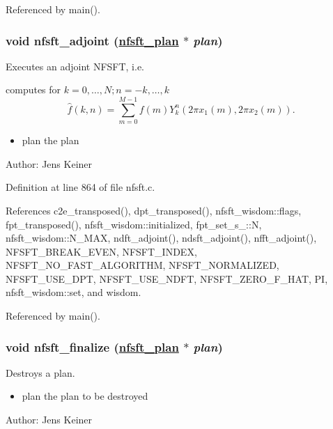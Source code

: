 Referenced by main().\hypertarget{group__nfsft_ga9}{
\subsubsection[nfsft\_\-adjoint]{\setlength{\rightskip}{0pt plus 5cm}void nfsft\_\-adjoint (\hyperlink{structnfsft__plan}{nfsft\_\-plan} $\ast$ {\em plan})}}
\label{group__nfsft_ga9}


Executes an adjoint NFSFT, i.e. 

computes for $k=0,\ldots,N; n=-k,\ldots,k$ \[ \hat{f}(k,n) = \sum_{m = 0}^{M-1} f(m) Y_k^n\left(2\pi x_1(m), 2\pi x_2(m)\right). \]

\begin{itemize}
\item plan the plan\end{itemize}
\begin{Desc}
\item[Author:]Jens Keiner \end{Desc}


Definition at line 864 of file nfsft.c.

References c2e\_\-transposed(), dpt\_\-transposed(), nfsft\_\-wisdom::flags, fpt\_\-transposed(), nfsft\_\-wisdom::initialized, fpt\_\-set\_\-s\_\-::N, nfsft\_\-wisdom::N\_\-MAX, ndft\_\-adjoint(), ndsft\_\-adjoint(), nfft\_\-adjoint(), NFSFT\_\-BREAK\_\-EVEN, NFSFT\_\-INDEX, NFSFT\_\-NO\_\-FAST\_\-ALGORITHM, NFSFT\_\-NORMALIZED, NFSFT\_\-USE\_\-DPT, NFSFT\_\-USE\_\-NDFT, NFSFT\_\-ZERO\_\-F\_\-HAT, PI, nfsft\_\-wisdom::set, and wisdom.

Referenced by main().\hypertarget{group__nfsft_ga10}{
\subsubsection[nfsft\_\-finalize]{\setlength{\rightskip}{0pt plus 5cm}void nfsft\_\-finalize (\hyperlink{structnfsft__plan}{nfsft\_\-plan} $\ast$ {\em plan})}}
\label{group__nfsft_ga10}


Destroys a plan. 

\begin{itemize}
\item plan the plan to be destroyed\end{itemize}
\begin{Desc}
\item[Author:]Jens Keiner \end{Desc}


